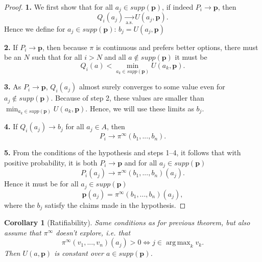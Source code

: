 \documentclass{article}
\DeclareMathOperator*{\argmax}{arg\,max}
\newtheorem{corollary}[thm]{Corollary}
\begin{document}
\begin{proof}
\textbf{1.} We first show that for all $a_j\in supp (\mathbf{p})$, if indeed $P_i\rightarrow \mathbf{p}$, then 
\begin{equation}\label{eq:proof-part-one-main-eq}
Q_i(a_j)\underset{\text{a.s.}}{\rightarrow} U(a_j,\mathbf{p}).
\end{equation}
Hence we define for $a_j\in supp (\mathbf{p})$: $b_j=U(a_j,\mathbf{p})$

\textbf{2.} If $P_i\rightarrow \mathbf{p}$, then because $\pi$ is continuous and prefers better options, there must be an $N$ such that for all $i>N$ and all $a\notin supp (\mathbf{p})$ it must be
\begin{equation}\label{eq:proof-part-one-main-eq}
Q_i(a)< \min_{a_k\in supp (\mathbf{p}) } U(a_k,\mathbf{p}).
\end{equation}

\textbf{3.} As $P_i \rightarrow \mathbf{p}$, $Q_i(a_j)$ almost surely converges to some value even for $a_j\notin supp(\mathbf{p})$. Because of step 2, these values are smaller than $\min_{a_k\in supp (\mathbf{p}) } U(a_k,\mathbf{p})$. Hence, we will use these limits as $b_j$.

\textbf{4.} If $Q_i(a_j)\rightarrow b_j$ for all $a_j\in A$, then
\begin{equation}\label{eq:proof-part-one-main-eq}
P_i \rightarrow \pi^\infty (b_1,...,b_n).
\end{equation}

\textbf{5.} From the conditions of the hypothesis and steps 1--4, it follows that with positive probability, it is both $P_i\rightarrow \mathbf{p}$ and for all $a_j\in supp(\mathbf{p})$
\begin{equation}\label{eq:proof-part-one-main-eq}
P_i(a_j) \rightarrow \pi^\infty  (b_1,...,b_n)(a_j).
\end{equation}
Hence it must be for all $a_j\in supp(\mathbf{p})$
\begin{equation}
\mathbf{p}(a_j)=\pi^\infty (b_1,...,b_n)(a_j),
\end{equation}
where the $b_j$ satisfy the claims made in the hypothesis.
\end{proof}

\begin{corollary}[Ratifiability]
Same conditions as for previous theorem, but also assume that $\pi^\infty$ doesn't explore, i.e. that
\begin{equation}
\pi^\infty(v_1,...,v_n)(a_j) >0 \iff j\in \argmax_k v_k.
\end{equation}
Then $U(a,\mathbf{p})$ is constant over $a\in supp(\mathbf{p})$.
\end{corollary}
\end{document}
